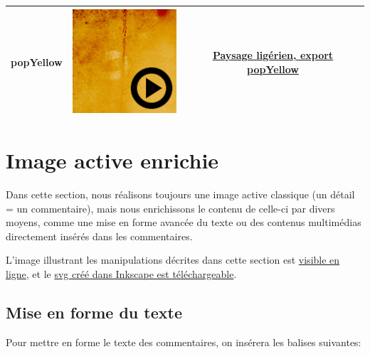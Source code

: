 \documentclass[a4paper,12pt]{report}
\begin{document}
\begin{center}
\begin{tabular}{|l|c|c|}
\hline
popYellow &  \includegraphics[scale=0.5]{./images/popYellow} & \href{http://geoffrey-gekiere.ac-versailles.fr/xia1/popYellow}{Paysage ligérien, export popYellow}\\
\hline
\end{tabular}
\end{center}

\section{Image active enrichie}

Dans cette section, nous réalisons toujours une image active classique (un détail = un commentaire),
mais nous enrichissons le contenu de celle-ci par divers moyens, comme une mise en forme avancée du texte ou des contenus 
multimédias directement insérés dans les commentaires.

L'image illustrant les manipulations décrites dans cette section est \href{http://geoffrey-gekiere.ac-versailles.fr/xia2/}{visible en ligne}, et le \href{http://geoffrey-gekiere.ac-versailles.fr/xia2/svg/xia2.svg}{svg créé dans Inkscape est téléchargeable}.

\subsection{Mise en forme du texte}

Pour mettre en forme le texte des commentaires, on insérera les balises suivantes:
\end{document}
